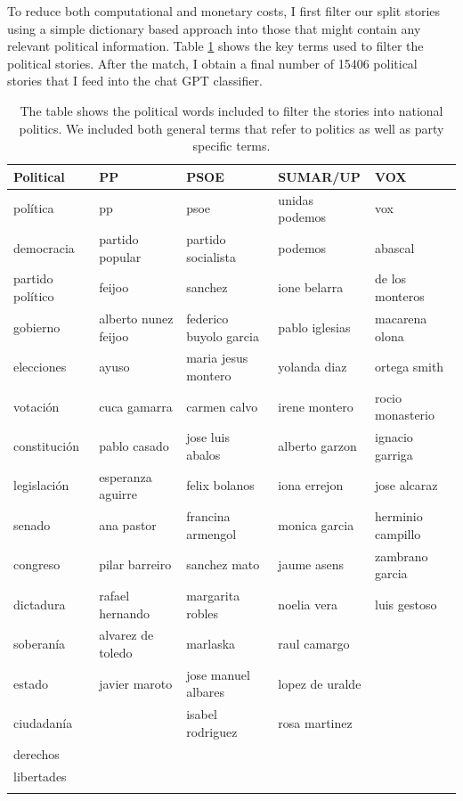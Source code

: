 \documentclass[12pt]{article}
\begin{document}
	
	
	
	To reduce both computational and monetary costs, I first filter our split stories using a simple dictionary based approach into those that might contain any relevant political information. Table \ref{table:politics} shows the key terms used to filter the political stories. After the match, I obtain a final number of 15406 political stories that I feed into the chat GPT classifier.
	
	\clearpage
	
	\begin{longtable}{|l|l|l|l|l|}
		\hline
		\textbf{Political} & \textbf{PP} & \textbf{PSOE} & \textbf{SUMAR/UP} & \textbf{VOX} \\
		\hline
		política & pp & psoe & unidas podemos & vox \\
		democracia & partido popular & partido socialista & podemos & abascal \\
		partido político & feijoo & sanchez & ione belarra &de los monteros \\
		gobierno & alberto nunez feijoo & federico buyolo garcia & pablo iglesias & macarena olona \\
		elecciones & ayuso & maria jesus montero & yolanda diaz & ortega smith \\
		votación & cuca gamarra & carmen calvo & irene montero & rocio monasterio \\
		constitución & pablo casado & jose luis abalos & alberto garzon & ignacio garriga \\
		legislación & esperanza aguirre & felix bolanos & iona errejon &jose alcaraz \\
		senado & ana pastor & francina armengol & monica garcia & herminio campillo \\
		congreso & pilar barreiro & sanchez mato & jaume asens & zambrano garcia \\
		dictadura & rafael hernando & margarita robles & noelia vera & luis gestoso \\
		soberanía &alvarez de toledo & marlaska & raul camargo & \\
		estado & javier maroto & jose manuel albares &lopez de uralde & \\
		ciudadanía &  & isabel rodriguez & rosa martinez & \\
		derechos &  &  &  & \\
		libertades &  &  &  & \\
		\hline
		\caption{The table shows the political words included to filter the stories into national politics. We included both general terms that refer to politics as well as party specific terms.}
		\label{table:politics}
	\end{longtable}
	
\end{document}
